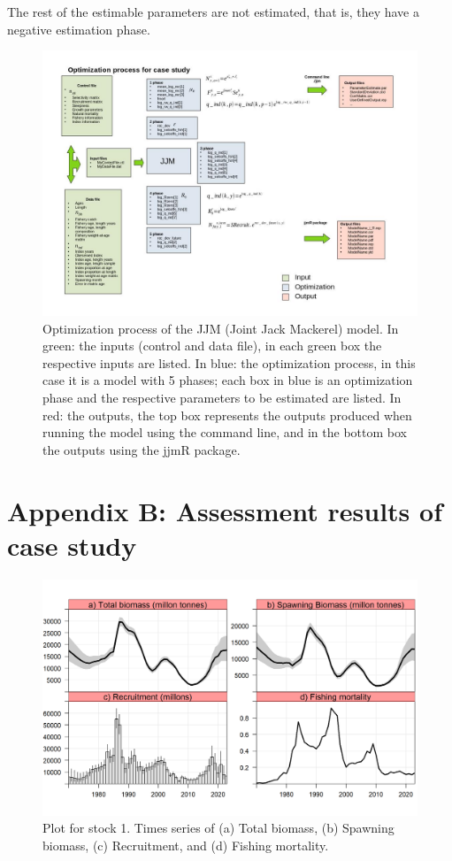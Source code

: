 \documentclass{article}
\begin{document}
The rest of the estimable parameters are not estimated, that is, they have a negative estimation phase.
\begin{figure}[H]
    \centering
    \includegraphics[scale = 0.6]{graficofases2.jpg}
    \caption{Optimization process of the JJM (Joint Jack Mackerel) model. In green: the inputs (control and data file), in each green box the respective inputs are listed. In blue: the optimization process, in this case it is a model with 5 phases; each box in blue is an optimization phase and the respective parameters to be estimated are listed. In red: the outputs, the top box represents the outputs produced when running the model using the command line, and in the bottom box the outputs using the jjmR package.}
    \label{fig:mesh1}
\end{figure}





\label{section:AppendixA}
\section{Appendix B: Assessment results of case study}
\begin{figure}[H]
    \centering
    \includegraphics[scale = .9]{stock1.png}
    \caption{Plot for stock 1.  Times series of (a) Total biomass, (b) Spawning biomass, (c) Recruitment, and (d) Fishing mortality.}
    \label{fig:mesh2}
\end{figure}
\end{document}
